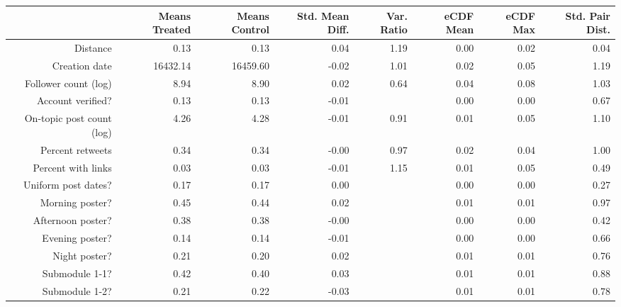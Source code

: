 \begin{table}[ht]
\centering
\begin{tabular}{rrrrrrrr}
  & Means Treated & Means Control & Std. Mean Diff. & Var. Ratio & eCDF Mean & eCDF Max & Std. Pair Dist. \\ 
  \hline
Distance & 0.13 & 0.13 & 0.04 & 1.19 & 0.00 & 0.02 & 0.04 \\ 
   \hline
Creation date & 16432.14 & 16459.60 & -0.02 & 1.01 & 0.02 & 0.05 & 1.19 \\ 
   \hline
Follower count (log) & 8.94 & 8.90 & 0.02 & 0.64 & 0.04 & 0.08 & 1.03 \\ 
   \hline
Account verified? & 0.13 & 0.13 & -0.01 &  & 0.00 & 0.00 & 0.67 \\ 
   \hline
On-topic post count (log) & 4.26 & 4.28 & -0.01 & 0.91 & 0.01 & 0.05 & 1.10 \\ 
   \hline
Percent retweets & 0.34 & 0.34 & -0.00 & 0.97 & 0.02 & 0.04 & 1.00 \\ 
   \hline
Percent with links & 0.03 & 0.03 & -0.01 & 1.15 & 0.01 & 0.05 & 0.49 \\ 
   \hline
Uniform post dates? & 0.17 & 0.17 & 0.00 &  & 0.00 & 0.00 & 0.27 \\ 
   \hline
Morning poster? & 0.45 & 0.44 & 0.02 &  & 0.01 & 0.01 & 0.97 \\ 
   \hline
Afternoon poster? & 0.38 & 0.38 & -0.00 &  & 0.00 & 0.00 & 0.42 \\ 
   \hline
Evening poster? & 0.14 & 0.14 & -0.01 &  & 0.00 & 0.00 & 0.66 \\ 
   \hline
Night poster? & 0.21 & 0.20 & 0.02 &  & 0.01 & 0.01 & 0.76 \\ 
   \hline
Submodule 1-1? & 0.42 & 0.40 & 0.03 &  & 0.01 & 0.01 & 0.88 \\ 
   \hline
Submodule 1-2? & 0.21 & 0.22 & -0.03 &  & 0.01 & 0.01 & 0.78 \\ 
   \hline
\end{tabular}
\end{table}

